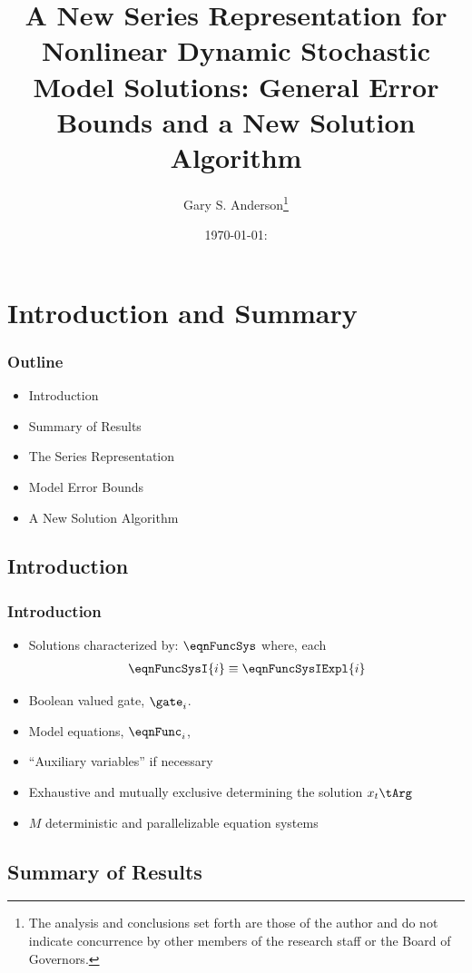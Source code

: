 \documentclass[notheorems]{beamer}
\author{Gary S. Anderson\thanks{The analysis and conclusions set forth are those of the author and do not indicate concurrence by other members of the research staff or the Board of Governors.}}
\title{A New Series Representation for 
Nonlinear Dynamic Stochastic Model Solutions: General Error Bounds and a New Solution Algorithm}
\date{\today: \currenttime}
\begin{document}
\begin{frame}
\maketitle
\end{frame}

\section{Introduction and Summary}

\begin{frame}
  \frametitle{Outline}
  \begin{itemize}
  \item Introduction
  \item Summary of Results
  \item The Series Representation
  \item Model Error Bounds
  \item A New Solution Algorithm
  \end{itemize}
\end{frame}

\subsection{Introduction}
\label{sec:introduction}


\begin{frame}
  \frametitle{Introduction}
{\small
\begin{itemize}
\item Solutions characterized by: $\eqnFuncSys$  where, each 
\begin{gather}
\eqnFuncSysI{i}\equiv \eqnFuncSysIExpl{i} \label{eqnGates}
\end{gather}
\item Boolean valued gate, $\gate_i$. 
\item Model equations, $\eqnFunc_i$,  
\item ``Auxiliary variables'' if necessary
\item Exhaustive and mutually exclusive determining the solution  $x_t\tArg$
\item $M$ deterministic and parallelizable equation systems
\end{itemize}
}
\end{frame}

\subsection{Summary of Results}
\label{sec:summary-results}
\end{document}
